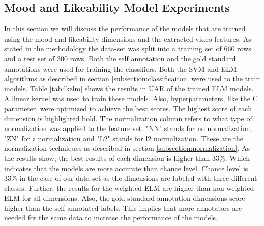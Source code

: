 \subsection{Mood and Likeability Model Experiments}\label{subsection:moodlikeexp}
In this section we will discuss the performance of the models that are trained using the mood and likeability dimensions and the extracted video features. As stated in the methodology the data-set was split into a training set of 660 rows and a test set of 300 rows. Both the self annotation and the gold standard annotations were used for training the classifiers. Both the SVM and ELM algorithms as described in section \ref{subsection:classificaiton} were used to the train models. Table \ref{tab:lkelm} shows the results in UAR of the trained ELM models. A linear kernel was used to train these models. Also, hyperparameters, like the C parameter, were optimized to achieve the best scores. The highest score of each dimension is highlighted bold. The normalization column refers to what type of normalization was applied to the feature set. "NN" stands for no normalization, "ZN" for z normalization and "L2" stands for l2 normalization. These are the normalization techniques as described in section \ref{subsection:normalization}. As the results show, the best results of each dimension is higher than 33\%. Which indicates that the models are more accurate than chance level. Chance level is 33\% in the case of our data-set as the dimensions are labeled with three different classes. Further, the results for the weighted ELM are higher than non-weighted ELM for all dimensions. Also, the gold standard annotation dimensions score higher than the self annotated labels. This implies that more annotators are needed for the same data to increase the performance of the models. 

